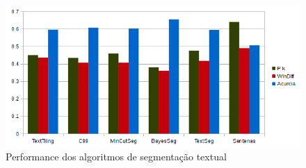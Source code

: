 
  











  \begin{figure}[!h]
	  \centering
	  \includegraphics[width=1\textwidth]{conteudo/capitulos/figs/graficos/resumo-3.png}
	  \caption{Performance dos algoritmos de segmentação textual}
	  \label{fig:grafico-medidas-tradicionais}
  \end{figure}






